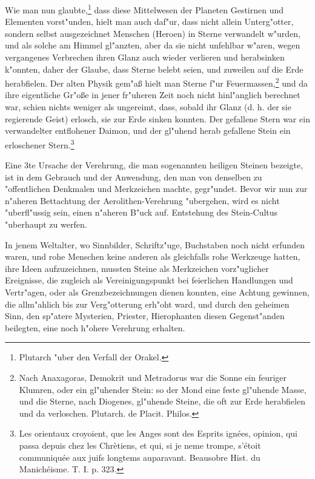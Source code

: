 \documentclass[a4paper, 11pt, oneside, polutonikogreek, german]{article}
\begin{document}
Wie man nun glaubte,\footnote{Plutarch "uber den Verfall der Orakel.} dass diese Mittelwesen der Planeten Gestirnen und Elementen vorst"unden, hielt man auch daf"ur, dass nicht allein Unterg"otter, sondern selbst ausgezeichnet Menschen (Heroen) in Sterne verwandelt w"urden, und als solche am Himmel gl"anzten, aber da sie nicht unfehlbar w"aren, wegen vergangenes Verbrechen ihren Glanz auch wieder verlieren und herabsinken k"onnten, daher der Glaube, dass Sterne belebt seien, und zuweilen auf die Erde herabfielen. Der alten Physik gem"aß hielt man Sterne f"ur Feuermassen,\footnote{Nach Anaxagoras, Demokrit und Metradorus war die Sonne ein feuriger Klumren, oder ein gl"uhender Stein: so der Mond eine feste gl"uhende Masse, und die Sterne, nach Diogenes, gl"uhende Steine, die oft zur Erde herabfielen und da verloschen. Plutarch. de Placit. Philos.} und da ihre eigentliche Gr"oße in jener fr"uheren Zeit noch nicht hinl"anglich berechnet war, schien nichts weniger als ungereimt, dass, sobald ihr Glanz (d. h. der sie regierende Geist) erlosch, sie zur Erde sinken konnten. Der gefallene Stern war ein verwandelter entflohener Daimon, und der gl"uhend herab gefallene Stein ein erloschener Stern.\footnote{Les orientaux croyoient, que les Anges sont des Esprits ignées, opinion, qui passa depuis chez les Chrètiens, et qui, si je neme trompe, s'étoit communiquée aux juifs longtems auparavant. Beausobre Hist. du Manichéisme. T. I. p. 323.}

Eine 3te Ursache der Verehrung, die man sogenannten heiligen Steinen bezeigte, ist in dem Gebrauch und der Anwendung, den man von denselben zu "offentlichen Denkmalen und Merkzeichen machte, gegr"undet. Bevor wir nun zur n"aheren Bettachtung der Aerolithen-Verehrung "ubergehen, wird es nicht "uberfl"ussig sein, einen n"aheren B"uck auf. Entstehung des Stein-Cultus "uberhaupt zu werfen.

In jenem Weltalter, wo Sinnbilder, Schriftz"uge, Buchstaben noch nicht erfunden waren, und rohe Menschen keine anderen als gleichfalls rohe Werkzeuge hatten, ihre Ideen aufzuzeichnen, mussten Steine als Merkzeichen vorz"uglicher Ereignisse, die zugleich als Vereinigungspunkt bei feierlichen Handlungen und Vertr"agen, oder als Grenzbezeichnungen dienen konnten, eine Achtung gewinnen, die allm"ahlich bis zur Verg"otterung erh"oht ward, und durch den geheimen Sinn, den sp"atere Mysterien, Priester, Hierophanten diesen Gegenst"anden beilegten, eine noch h"ohere Verehrung erhalten.
\end{document}
